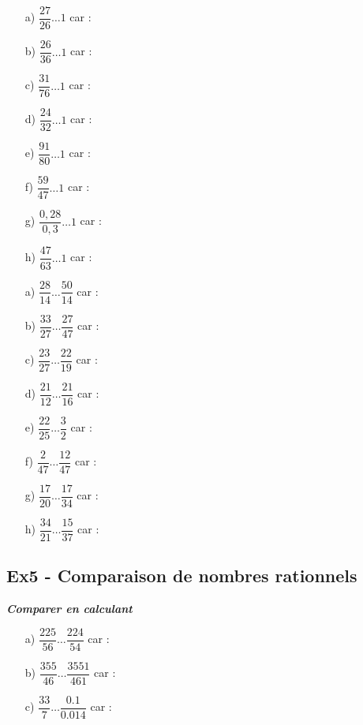 \documentclass[11pt]{article}
\begin{document}
\begin{multicols}{2}

  \begin{enumerate}
    \item[a)] $ \dfrac{27}{26} \ldots 1 $ car : \dotfill
    \item[b)] $ \dfrac{26}{36}  \ldots 1 $ car : \dotfill
    \item[c)] $ \dfrac{31}{76} \ldots 1 $ car : \dotfill
    \item[d)] $ \dfrac{24}{32} \ldots 1 $ car : \dotfill
    \item[e)] $ \dfrac{91}{80} \ldots 1 $ car : \dotfill
    \item[f)] $ \dfrac{59}{47} \ldots 1 $ car : \dotfill
    \item[g)] $ \dfrac{0,28}{0,3} \ldots 1 $ car : \dotfill
    \item[h)] $ \dfrac{47}{63} \ldots 1 $ car : \dotfill
  \end{enumerate}

\columnbreak

  \begin{enumerate}
    \item[a)] $ \dfrac{28}{14} \ldots \dfrac{50}{14} $  car : \dotfill
    \item[b)] $ \dfrac{33}{27} \ldots  \dfrac{27}{47}  $  car : \dotfill
    \item[c)] $ \dfrac{23}{27} \ldots \dfrac{22}{19} $  car : \dotfill
    \item[d)] $ \dfrac{21}{12} \ldots  \dfrac{21}{16}  $  car : \dotfill
    \item[e)] $ \dfrac{22}{25} \ldots \dfrac{3}{2} $  car : \dotfill
    \item[f)] $ \dfrac{2}{47} \ldots  \dfrac{12}{47} $  car : \dotfill
    \item[g)] $ \dfrac{17}{20} \ldots \dfrac{17}{34} $  car : \dotfill
    \item[h)] $ \dfrac{34}{21} \ldots \dfrac{15}{37} $  car : \dotfill
  \end{enumerate}

\end{multicols}

\subsection*{Ex5 - Comparaison de nombres rationnels}

\textit{\textbf{Comparer en calculant}}

\begin{enumerate}
  \item[a)] $ \dfrac{225}{56} \ldots \dfrac{224}{54} $  car : \dotfill
  \item[b)] $ \dfrac{355}{46} \ldots \dfrac{3551}{461} $  car : \dotfill
  \item[c)] $ \dfrac{33}{7} \ldots \dfrac{0.1}{0.014} $  car : \dotfill
\end{enumerate}
\end{document}
